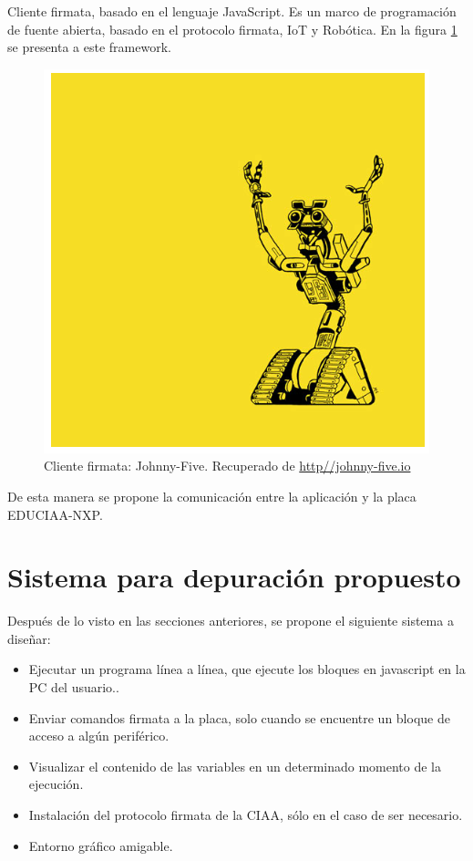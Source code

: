 Cliente firmata, basado en el lenguaje JavaScript. Es un marco de programación de fuente
abierta, basado en el protocolo firmata, IoT y Robótica. En la figura \ref{fig:johnny} se presenta a este framework.

\begin{figure}[h]
	\centering
	\includegraphics[scale=.50]{./Figures/johnny.png}
	\caption{Cliente firmata: Johnny-Five. Recuperado de \url{http//johnny-five.io}} 
	\label{fig:johnny}
\end{figure}

De esta manera se propone la comunicación entre la aplicación y la placa EDUCIAA-NXP.

\section{Sistema para depuración propuesto}

Después de lo visto en las secciones anteriores, se propone el siguiente sistema a diseñar:

\begin{itemize}
	\item Ejecutar un programa línea a línea, que ejecute los bloques en javascript en la PC del usuario..	
	\item Enviar comandos firmata a la placa, solo cuando se encuentre un bloque de acceso a algún periférico.
	\item Visualizar el contenido de las variables en un determinado momento de la ejecución.
	\item Instalación del protocolo firmata de la CIAA, sólo en el caso de ser necesario.
	\item Entorno gráfico amigable.
\end{itemize}

